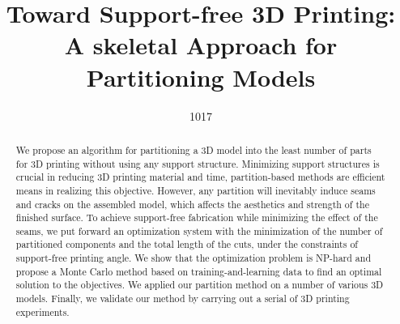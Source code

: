 \documentclass{egpubl}
\title[Toward Support-free 3D Printing:]%
      {Toward Support-free 3D Printing: A skeletal Approach for Partitioning Models}
\author[1017]{1017}
\begin{document}

\maketitle

\begin{abstract}
   We propose an algorithm for partitioning a 3D model into the least number of parts for 3D printing without using any support structure. Minimizing support structures is crucial in reducing 3D printing material and time, partition-based methods are efficient means in realizing this objective. However, any partition will inevitably induce seams and cracks on the assembled model, which affects the aesthetics and strength of the finished surface. To achieve support-free fabrication while minimizing the effect of the seams, we put forward an optimization system with the minimization of the number of partitioned components and the total length of the cuts, under the constraints of support-free printing angle. We show that the optimization problem is NP-hard and propose a Monte Carlo method based on training-and-learning data to find an optimal solution to the objectives. We applied our partition method on a number of various 3D models. Finally, we validate our method by carrying out a serial of 3D printing experiments.


\begin{classification} %
\end{classification}

\end{abstract}
















\end{document}
